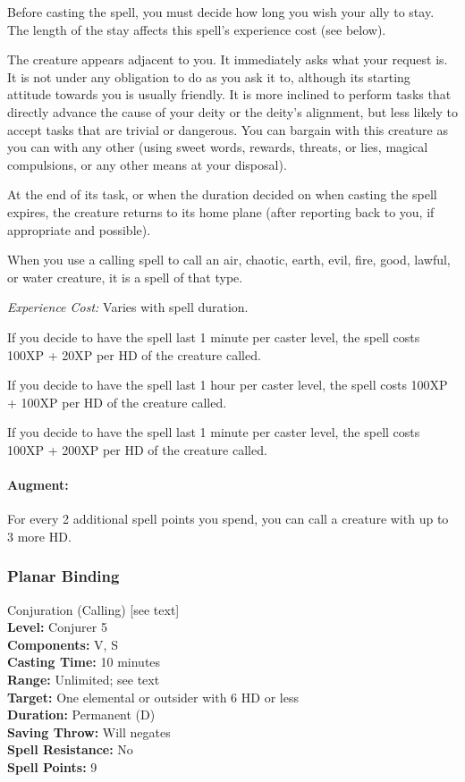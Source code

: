 Before casting the spell, you must decide how long you wish your ally to stay. 
The length of the stay affects this spell's experience cost (see below).

The creature appears adjacent to you. 
It immediately asks what your request is.
It is not under any obligation to do as you ask it to, although its starting attitude towards you is usually friendly.
It is more inclined to perform tasks that directly advance the cause of your deity or the deity's alignment, but less likely to accept tasks that are trivial or dangerous. You can bargain with this creature as you can with any other (using sweet words, rewards, threats, or lies, magical compulsions, or any other means at your disposal).

At the end of its task, or when the duration decided on when casting the spell expires, the creature returns to its home plane (after reporting back to you, if appropriate and possible).

When you use a calling spell to call an air, chaotic, earth, evil, fire, good, lawful, or water creature, it is a spell of that type.

\emph{Experience Cost:} Varies with spell duration.
\begin{list}{}{\leftmargin=1em}
 \item If you decide to have the spell last 1 minute per caster level, the spell costs 100XP + 20XP per HD of the creature called.
 \item If you decide to have the spell last 1 hour per caster level, the spell costs 100XP + 100XP per HD of the creature called. 
 \item If you decide to have the spell last 1 minute per caster level, the spell costs 100XP + 200XP per HD of the creature called. 
\end{list} 

\paragraph{Augment:} For every 2 additional spell points you spend, you can call a creature with up to 3 more HD.
\subsubsection{Planar Binding}
\label{Spell:PlanarBinding}
Conjuration (Calling) [see text]
\\ \textbf{Level:} Conjurer 5
\\ \textbf{Components:} V, S
\\ \textbf{Casting Time:} 10 minutes
\\ \textbf{Range:} Unlimited; see text
\\ \textbf{Target:} One elemental or outsider with 6 HD or less
\\ \textbf{Duration:} Permanent (D)
\\ \textbf{Saving Throw:} Will negates
\\ \textbf{Spell Resistance:} No
\\ \textbf{Spell Points:} 9

